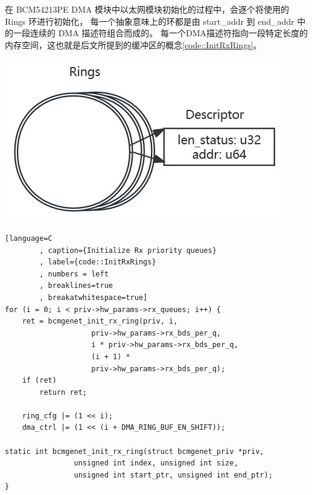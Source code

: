     \begin{adjustwidth}{0cm}{} %
    \begin{minipage}[b]{0.5\linewidth}
        \setlength{\parindent}{2em} %
        在 BCM54213PE DMA 模块中以太网模块初始化的过程中，会逐个将使用的 Rings 环进行初始化，
        每一个抽象意味上的环都是由 start\_addr 到 end\_addr 中的一段连续的 DMA 描述符组合而成的。
        每一个DMA描述符指向一段特定长度的内存空间，这也就是后文所提到的缓冲区的概念\ref{code::InitRxRings}。

    \end{minipage}
    \hfill
    \begin{minipage}[b]{0.45\linewidth}
        \includegraphics[scale=0.6]{./imgs/Rings_and_Descs.jpg}        
    \end{minipage}
    \end{adjustwidth}

    \newpage
    \begin{lstlisting}[language=C
        , caption={Initialize Rx priority queues}
        , label={code::InitRxRings}
        , numbers = left
        , breaklines=true
        , breakatwhitespace=true]
for (i = 0; i < priv->hw_params->rx_queues; i++) {
    ret = bcmgenet_init_rx_ring(priv, i,
                    priv->hw_params->rx_bds_per_q,
                    i * priv->hw_params->rx_bds_per_q,
                    (i + 1) *
                    priv->hw_params->rx_bds_per_q);
    if (ret)
        return ret;

    ring_cfg |= (1 << i);
    dma_ctrl |= (1 << (i + DMA_RING_BUF_EN_SHIFT));

static int bcmgenet_init_rx_ring(struct bcmgenet_priv *priv,
                unsigned int index, unsigned int size,
                unsigned int start_ptr, unsigned int end_ptr);
}
    \end{lstlisting}

